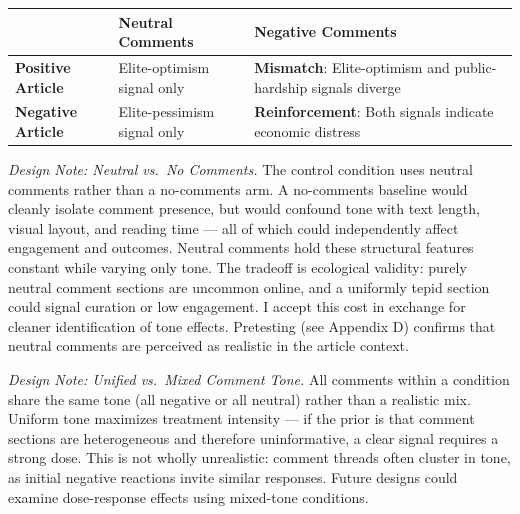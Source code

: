 \documentclass[
  12pt]{article}
\newcounter{none} %
\begin{document}
{\def\LTcaptype{none} %
\begin{longtable}[]{@{}
  >{\raggedright\arraybackslash}p{}
  >{\raggedright\arraybackslash}p{}
  >{\raggedright\arraybackslash}p{}@{}}
\toprule\noalign{}
\begin{minipage}[b]{\linewidth}\raggedright
\end{minipage} & \begin{minipage}[b]{\linewidth}\raggedright
Neutral Comments
\end{minipage} & \begin{minipage}[b]{\linewidth}\raggedright
Negative Comments
\end{minipage} \\
\midrule\noalign{}
\endhead
\bottomrule\noalign{}
\endlastfoot
\textbf{Positive Article} & Elite-optimism signal only &
\textbf{Mismatch}: Elite-optimism and public-hardship signals diverge \\
\textbf{Negative Article} & Elite-pessimism signal only &
\textbf{Reinforcement}: Both signals indicate economic distress \\
\end{longtable}
}

\emph{Design Note: Neutral vs.~No Comments.} The control condition uses
neutral comments rather than a no-comments arm. A no-comments baseline
would cleanly isolate comment presence, but would confound tone with
text length, visual layout, and reading time --- all of which could
independently affect engagement and outcomes. Neutral comments hold
these structural features constant while varying only tone. The tradeoff
is ecological validity: purely neutral comment sections are uncommon
online, and a uniformly tepid section could signal curation or low
engagement. I accept this cost in exchange for cleaner identification of
tone effects. Pretesting (see Appendix D) confirms that neutral comments
are perceived as realistic in the article context.

\emph{Design Note: Unified vs.~Mixed Comment Tone.} All comments within
a condition share the same tone (all negative or all neutral) rather
than a realistic mix. Uniform tone maximizes treatment intensity --- if
the prior is that comment sections are heterogeneous and therefore
uninformative, a clear signal requires a strong dose. This is not wholly
unrealistic: comment threads often cluster in tone, as initial negative
reactions invite similar responses. Future designs could examine
dose-response effects using mixed-tone conditions.
\end{document}
